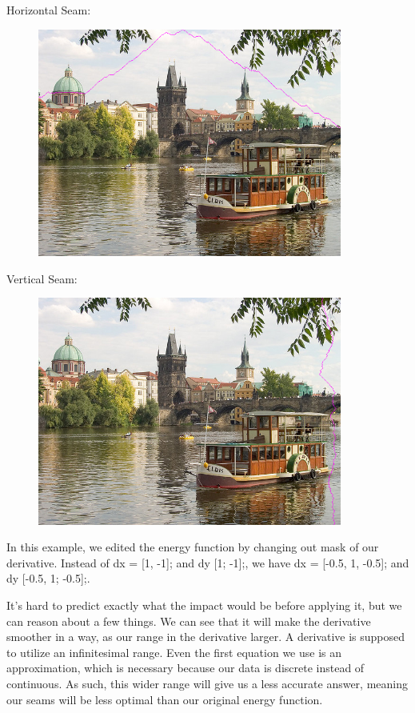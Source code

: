 \documentclass[12pt]{article}
\begin{document}
\noindent
Horizontal Seam:
\begin{figure}[H]
  \includegraphics[width=100mm]{PS1_Q5_2.png}
\end{figure}

\noindent
Vertical Seam:
\begin{figure}[H]
  \includegraphics[width=100mm]{PS1_Q5_1.png}
\end{figure}

\noindent
In this example, we edited the energy function by changing out mask of our derivative. Instead of dx = [1, -1]; and dy [1; -1];, we have dx = [-0.5, 1, -0.5]; and dy [-0.5, 1; -0.5];.

\noindent
It's hard to predict exactly what the impact would be before applying it, but we can reason about a few things. We can see that it will make the derivative smoother in a way, as our range in the derivative larger. A derivative is supposed to utilize an infinitesimal range. Even the first equation we use is an approximation, which is necessary because our data is discrete instead of continuous. As such, this wider range will give us a less accurate answer, meaning our seams will be less optimal than our original energy function.
\end{document}
